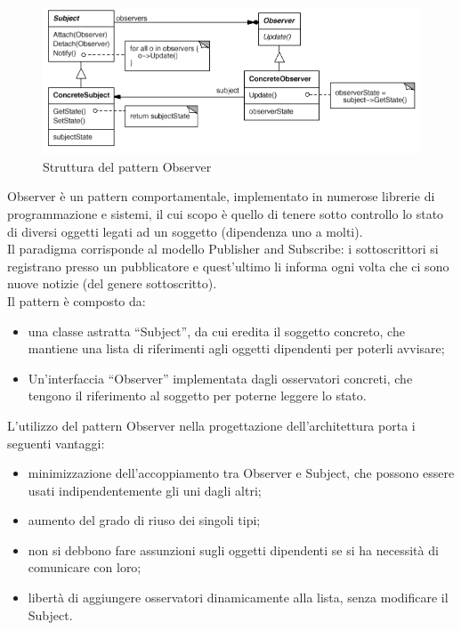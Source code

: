 	 \label{app:observer}
		\begin{figure}[H]\centering
        \includegraphics[scale=0.7]{SpecificaTecnica/Pics/Observer}
        \caption{Struttura del pattern Observer}
		\end{figure}
		Observer è un pattern comportamentale, implementato in numerose librerie di programmazione e sistemi, il cui scopo è quello di tenere sotto controllo lo stato di diversi oggetti legati ad un soggetto (dipendenza uno a molti). \\
		Il paradigma corrisponde al modello Publisher and Subscribe: i sottoscrittori si registrano presso un pubblicatore e quest’ultimo li informa ogni volta che ci sono nuove notizie (del genere sottoscritto).\\
		Il pattern è composto da:
		\begin{itemize}
		\item una classe astratta “Subject”, da cui eredita il soggetto concreto, che mantiene una lista di riferimenti agli oggetti dipendenti per poterli avvisare;
		\item Un’interfaccia “Observer” implementata dagli osservatori concreti, che tengono il riferimento al soggetto per poterne leggere lo stato.
		\end{itemize}
			L’utilizzo del pattern Observer nella progettazione dell’architettura porta i seguenti vantaggi:
			\begin{itemize}
			\item minimizzazione dell’accoppiamento tra Observer e Subject, che possono essere usati indipendentemente gli uni dagli altri;
			\item aumento del grado di riuso dei singoli tipi;
			\item non si debbono fare assunzioni sugli oggetti dipendenti se si ha necessità di comunicare con loro;
			\item libertà di aggiungere osservatori dinamicamente alla lista, senza modificare il Subject.
			\end{itemize}

